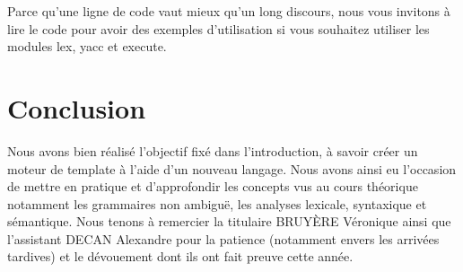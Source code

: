 \documentclass[10pt,a4paper]{article}
\begin{document}
	Parce qu'une ligne de code vaut mieux qu'un long discours, nous vous invitons à lire le code pour avoir des exemples d'utilisation si vous souhaitez utiliser les modules lex, yacc et execute.
	
	\newpage
	\section{Conclusion}
	Nous avons bien réalisé l'objectif fixé dans l'introduction, à savoir créer un moteur de template à l'aide d'un nouveau langage.
	Nous avons ainsi eu l'occasion de mettre en pratique et d'approfondir les concepts vus au cours théorique notamment les grammaires non ambiguë, les analyses lexicale, syntaxique et sémantique.
	Nous tenons à remercier la titulaire BRUYÈRE Véronique ainsi que l'assistant DECAN Alexandre pour la patience (notamment envers les arrivées tardives) et le dévouement dont ils ont fait preuve cette année.
	
\end{document}
